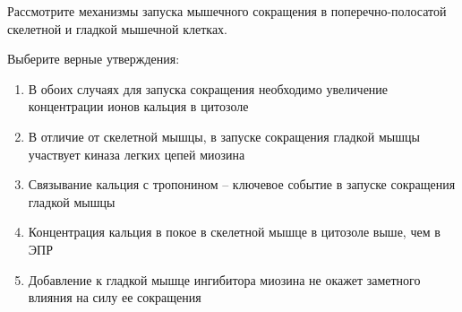 
Рассмотрите механизмы запуска мышечного сокращения
в поперечно-полосатой скелетной и гладкой мышечной клетках.


Выберите
верные утверждения:

\begin{enumerate}
    \item В обоих случаях для запуска сокращения необходимо увеличение концентрации ионов кальция в цитозоле
    \item В отличие от скелетной мышцы, в запуске сокращения гладкой мышцы участвует киназа легких цепей миозина
    \item Связывание кальция с тропонином – ключевое событие в запуске сокращения гладкой мышцы
    \item Концентрация кальция в покое в скелетной мышце в цитозоле выше, чем в ЭПР
    \item Добавление к гладкой мышце ингибитора миозина не окажет заметного влияния на силу ее сокращения
\end{enumerate}

